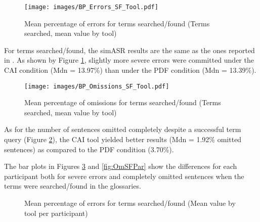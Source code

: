 \begin{figure}
\texttt{[image: images/BP\_Errors\_SF\_Tool.pdf]}
\caption[Mean percentage of errors (Terms searched/found, by tool]{Mean percentage of errors for terms searched/found (Terms searched, mean value by tool)}
\label{fig:BPErrSFTool}
\end{figure}

For terms searched/found, the simASR results are the same as the ones reported in . As shown by Figure \ref{fig:BPErrSFTool}, slightly more severe errors were committed under the CAI condition (Mdn = 13.97\%) than under the PDF condition (Mdn = 13.39\%).

\begin{figure}
\texttt{[image: images/BP\_Omissions\_SF\_Tool.pdf]}
\caption[Mean percentage of omissions (Terms searched/found, by tool]{Mean percentage of omissions for terms searched/found (Terms searched, mean value by tool)}
\label{fig:BPOmSFTool}
\end{figure}

As for the number of sentences omitted completely despite a successful term query (Figure \ref{fig:BPOmSFTool}), the CAI tool yielded better results (Mdn = 1.92\% omitted sentences) as compared to the PDF condition (3.70\%).

The bar plots in Figures \ref{fig:ErrSFPar} and \ref{fig:OmSFPar} show the differences for each participant both for severe errors and completely omitted sentences when the terms were searched/found in the glossaries.

\begin{figure}
\caption[Mean percentage of errors (Terms searched/found, by tool and participant]{Mean percentage of errors for terms searched/found (Mean value by tool per participant)}
\label{fig:ErrSFPar}
\end{figure}

